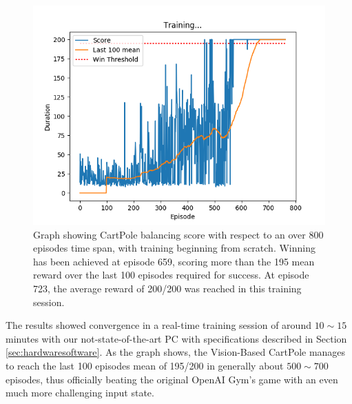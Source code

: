 \begin{figure}[h!]
	\centering
	\includegraphics[width=14cm]{images/Cartpole_vision_beaten@659_reached_perf@723.png}
	\caption{Graph showing CartPole balancing score with respect to an over 800 episodes time span, with training beginning from scratch. Winning has been achieved at episode 659, scoring more than the 195 mean reward over the last 100 episodes required for success. At episode 723, the average reward of 200/200 was reached in this training session.}
	\label{fig:CartPoleWon}
\end{figure}

The results showed convergence in a real-time training session of around $10\sim15$ minutes with our not-state-of-the-art PC with specifications described in Section \ref{sec:hardwaresoftware}. 
As the graph shows, the Vision-Based CartPole manages to reach the last 100 episodes mean of 195/200 in generally about $500\sim700$ episodes, thus officially beating the original OpenAI Gym's game with an even much more challenging input state.
